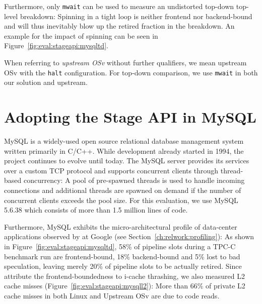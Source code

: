 \documentclass[12pt,a4paper]{book}
\begin{document}
Furthermore, only \texttt{mwait} can be used to measure an undistorted top-down top-level breakdown:
Spinning in a tight loop is neither frontend nor backend-bound and will thus inevitably blow up the retired fraction in the breakdown.
An example for the impact of spinning can be seen in Figure~\ref{fig:eval:stageapi:mysqltd}.

When referring to \emph{upstream OSv} without further qualifiers, we mean upstream OSv with the \texttt{halt} configuration.
For top-down comparison, we use \texttt{mwait} in both our solution and upstream.

\clearpage
\section{Adopting the Stage API in MySQL}\label{ch:eval:stageapi}
MySQL is a widely-used open source relational database management system written primarily in C/C++.
While development already started in 1994, the project continues to evolve until today.
The MySQL server provides its services over a custom TCP protocol and supports concurrent clients through thread-based concurrency:
A pool of pre-spawned threads is used to handle incoming connections and additional threads are spawned on demand if the number of concurrent clients exceeds the pool size.
For this evaluation, we use MySQL 5.6.38 which consists of
more than 1.5 million lines of code.~\cite{mysqlBeginDevelopment,mysqlThreading,mysqlPopularity}

Furthermore, MySQL exhibits the micro-architectural profile of data-center applications observed by \citeauthor*{kanev2015profiling} at Google (see Section~\ref{ch:relwork:profiling}):
As shown in Figure~\ref{fig:eval:stageapi:mysqltd}, 58\% of pipeline slots during a TPC-C benchmark run are frontend-bound, 18\% backend-bound and 5\% lost to bad speculation, leaving merely 20\% of pipeline slots to be actually retired.
Since \citeauthor*{kanev2015profiling} attribute the frontend-boundedness to i-cache thrashing, we also measured L2 cache misses (Figure~\ref{fig:eval:stageapi:mysqll2}):
More than 66\% of private L2 cache misses in both Linux and Upstream OSv are due to code reads.
\end{document}
